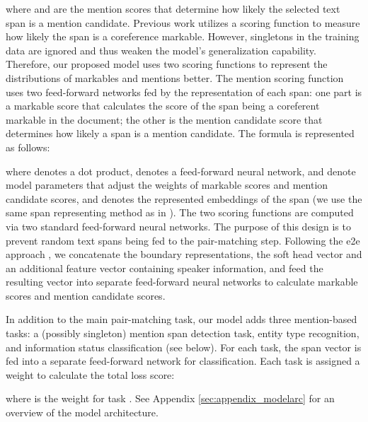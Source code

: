 \documentclass[11pt]{article}
\begin{document}
\vspace{-3mm}


\noindent where  and  are the mention scores that determine how likely the selected text span is a mention candidate. 
Previous work utilizes a scoring function to measure how likely the span is a coreference markable. However, singletons in the training data are ignored and thus weaken the model's generalization capability. Therefore, our proposed model uses two scoring functions to represent the distributions of markables and mentions better. The mention scoring function uses two feed-forward networks fed by the representation of each span: one part is a markable score that calculates the score of the span being a coreferent markable in the document; the other is the mention candidate score that determines how likely a span is a mention candidate. The formula is represented as follows:

\vspace{-3mm}




\noindent where  denotes a dot product,  denotes a feed-forward neural network,  and  denote model parameters that adjust the weights of markable scores and mention candidate scores, and  denotes the represented embeddings of the span (we use the same span representing method as in \citet{lee-etal-2017-end}). The two scoring functions are computed via two standard feed-forward neural networks. The purpose of this design is to prevent random text spans being fed to the pair-matching step. Following the e2e approach \citep{lee-etal-2017-end, lee-etal-2018-higher, joshi-etal-2020-spanbert}, we concatenate the boundary representations, the soft head vector and an additional feature vector  containing speaker information, and feed the resulting vector into separate feed-forward neural networks to calculate markable scores and mention candidate scores.

In addition to the main pair-matching task, our model adds three mention-based tasks: a (possibly singleton) mention span detection task, entity type recognition, and information status classification (see below). For each task, the span vector is fed into a separate feed-forward network for classification. Each task is assigned a weight to calculate the total loss score:

\vspace{-3mm}


\noindent where  is the weight for task . See Appendix \ref{sec:appendix_modelarc} for an overview of the model architecture.
\end{document}
